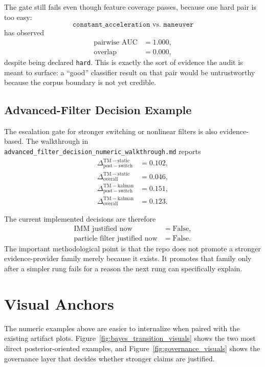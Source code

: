 \documentclass[11pt]{article}
\begin{document}
The gate still fails even though feature coverage passes, because one hard pair is too easy:
\begin{equation}
\texttt{constant\_acceleration} \text{ vs. } \texttt{maneuver}
\end{equation}
has observed
\begin{align}
\text{pairwise AUC} &= 1.000, \\
\text{overlap} &= 0.000,
\end{align}
despite being declared \texttt{hard}. This is exactly the sort of evidence the audit is meant to surface: a ``good'' classifier result on that pair would be untrustworthy because the corpus boundary is not yet credible.

\subsection{Advanced-Filter Decision Example}
The escalation gate for stronger switching or nonlinear filters is also evidence-based. The walkthrough in
\texttt{advanced\_filter\_decision\_numeric\_walkthrough.md}
reports
\begin{align}
\Delta_{\mathrm{post-switch}}^{\mathrm{TM-static}} &= 0.102, \\
\Delta_{\mathrm{overall}}^{\mathrm{TM-static}} &= 0.046, \\
\Delta_{\mathrm{post-switch}}^{\mathrm{TM-kalman}} &= 0.151, \\
\Delta_{\mathrm{overall}}^{\mathrm{TM-kalman}} &= 0.123.
\end{align}

The current implemented decisions are therefore
\begin{align}
\text{IMM justified now} &= \text{False}, \\
\text{particle filter justified now} &= \text{False}.
\end{align}
The important methodological point is that the repo does not promote a stronger evidence-provider family merely because it exists. It promotes that family only after a simpler rung fails for a reason the next rung can specifically explain.

\section{Visual Anchors}
The numeric examples above are easier to internalize when paired with the existing artifact plots. Figure~\ref{fig:bayes_transition_visuals} shows the two most direct posterior-oriented examples, and Figure~\ref{fig:governance_visuals} shows the governance layer that decides whether stronger claims are justified.
\end{document}
